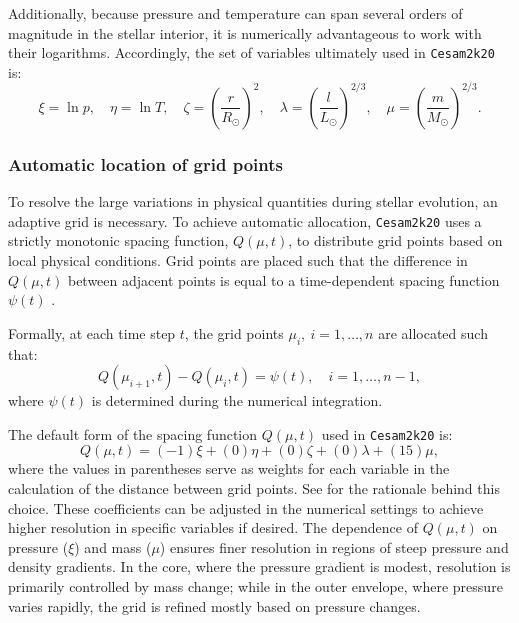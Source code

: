 \documentclass[12pt,a4paper]{article}
\begin{document}
Additionally, because pressure and temperature can span several orders of magnitude in the stellar interior, it is numerically advantageous to work with their logarithms. Accordingly, the set of variables ultimately used in \texttt{Cesam2k20} is:
\begin{equation}
  \xi = \ln p,\quad \eta = \ln T,\quad \zeta = \left(\frac{r}{R_\odot}\right)^2,\quad \lambda = \left(\frac{l}{L_\odot}\right)^{2/3},\quad \mu = \left(\frac{m}{M_\odot}\right)^{2/3}. \label{eq:cesam2k20_variables}
\end{equation}

\subsubsection{Automatic location of grid points}
\label{sec:cesam2k20_grid}

To resolve the large variations in physical quantities during stellar evolution, an adaptive grid is necessary. To achieve automatic allocation, \texttt{Cesam2k20} uses a strictly monotonic spacing function, $Q(\mu, t)$, to distribute grid points based on local physical conditions. Grid points are placed such that the difference in $Q(\mu, t)$ between adjacent points is equal to a time-dependent spacing function $\psi(t)$ \parencite{Eggleton1971,PressEtAl1992,Morel1997}.

Formally, at each time step $t$, the grid points $\mu_i,\ i = 1,\ldots,n$ are allocated such that:
\begin{equation}
  Q(\mu_{i+1}, t) - Q(\mu_i, t) = \psi(t),\quad i = 1, \ldots, n-1,
\end{equation}
where $\psi(t)$ is determined during the numerical integration. 

The default form of the spacing function $Q(\mu, t)$ used in \texttt{Cesam2k20} is:
\begin{equation}
  Q(\mu, t) = (-1)\xi + (0)\eta + (0)\zeta + (0)\lambda + (15)\mu, \label{eq:cesam2k20_spacing_func}
\end{equation}
where the values in parentheses serve as weights for each variable in the calculation of the distance between grid points. See \textcite{Morel1997,Manchon2021} for the rationale behind this choice. These coefficients can be adjusted in the numerical settings to achieve higher resolution in specific variables if desired. The dependence of $Q(\mu, t)$ on pressure ($\xi$) and mass ($\mu$) ensures finer resolution in regions of steep pressure and density gradients. In the core, where the pressure gradient is modest, resolution is primarily controlled by mass change; while in the outer envelope, where pressure varies rapidly, the grid is refined mostly based on pressure changes.
\end{document}
